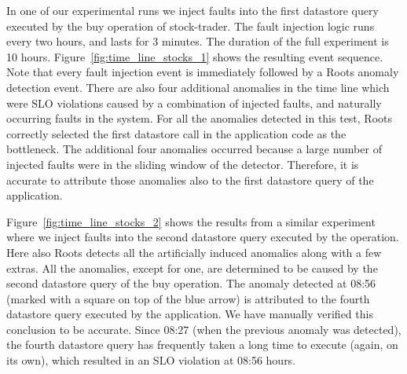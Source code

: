 In one of our experimental runs we inject faults into the first datastore query executed by the buy operation
of stock-trader. The fault injection logic runs every two hours, and lasts for 3 minutes. The duration of
the full experiment is 10 hours. 
Figure~\ref{fig:time_line_stocks_1} shows the resulting event sequence. Note that every fault injection
event is immediately followed by a Roots anomaly detection event. There are also four additional
anomalies in the time line which were SLO violations caused by a combination of injected faults, and
naturally occurring faults in the system. For all the anomalies detected
in this test, Roots correctly selected the first datastore call in the application code as the bottleneck. 
The additional four anomalies occurred because a large number of injected faults were in the sliding window
of the detector. Therefore, it is accurate to attribute those anomalies also to the first datastore query
of the application.

Figure~\ref{fig:time_line_stocks_2} shows the results from a similar experiment where we inject
faults into the second datastore query executed by the operation. Here also Roots detects all the
artificially induced anomalies along with a few extras. All the anomalies, except for one, 
are determined to be caused by the second
datastore query of the buy operation. The anomaly detected at 08:56 (marked with a square on top of the blue arrow) 
is attributed to the fourth datastore query executed by the application. We have manually verified this
conclusion to be accurate. Since 08:27 (when the previous anomaly was detected), the fourth datastore
query has frequently taken a long time to execute (again, on
its own), which resulted in an SLO violation at 08:56 hours.



